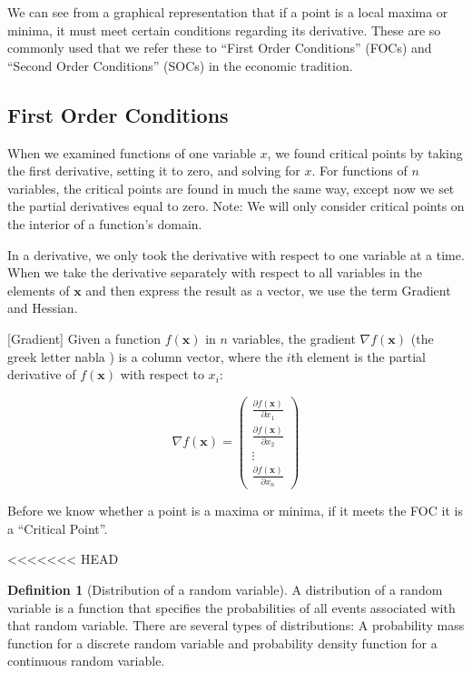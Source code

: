 \documentclass[]{book}
\theoremstyle{definition}
\newtheorem{definition}{Definition}[chapter]
\theoremstyle{definition}
\theoremstyle{definition}
\theoremstyle{remark}
\begin{document}
We can see from a graphical representation that if a point is a local maxima or minima, it must meet certain conditions regarding its derivative. These are so commonly used that we refer these to ``First Order Conditions'' (FOCs) and ``Second Order Conditions'' (SOCs) in the economic tradition.

\hypertarget{first-order-conditions}{%
\subsection*{First Order Conditions}\label{first-order-conditions}}

When we examined functions of one variable \(x\), we found critical points by taking the first derivative, setting it to zero, and solving for \(x\). For functions of \(n\) variables, the critical points are found in much the same way, except now we set the partial derivatives equal to zero. Note: We will only consider critical points on the interior of a function's domain.

In a derivative, we only took the derivative with respect to one variable at a time. When we take the derivative separately with respect to all variables in the elements of \(\mathbf{x}\) and then express the result as a vector, we use the term Gradient and Hessian.

[Gradient]
\protect\hypertarget{def:unnamed-chunk-52}{}{\label{def:unnamed-chunk-52} {} }
Given a function \(f(\textbf{x})\) in \(n\) variables, the gradient \(\nabla f(\mathbf{x})\) (the greek letter nabla ) is a column vector, where the \(i\)th element is the partial derivative of \(f(\textbf{x})\) with respect to \(x_i\):

\[\nabla f(\mathbf{x}) = \begin{pmatrix}
\frac{\partial f(\mathbf{x})}{\partial x_1}\\ \frac{\partial f(\mathbf{x})}{\partial x_2}\\
  \vdots \\ \frac{\partial f(\mathbf{x})}{\partial x_n} \end{pmatrix}\]

Before we know whether a point is a maxima or minima, if it meets the FOC it is a ``Critical Point''.

<<<<<<< HEAD
\begin{definition}[Distribution of a random variable]
\protect\hypertarget{def:unnamed-chunk-72}{}{\label{def:unnamed-chunk-72} {} }A distribution of a random variable is a function that specifies the probabilities of all events associated with that random variable. There are several types of distributions: A probability mass function for a discrete random variable and probability density function for a continuous random variable.
\end{definition}
\end{document}
